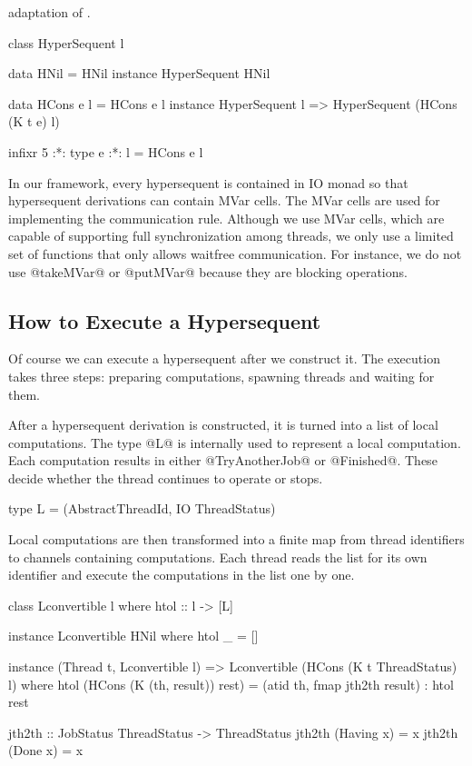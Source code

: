 adaptation of \citep{hetero}.
\begin{code}
class HyperSequent l

data HNil = HNil
instance HyperSequent HNil

data HCons e l = HCons e l
instance HyperSequent l =>
  HyperSequent (HCons (K t e) l)

infixr 5 :*:
type e :*: l = HCons e l
\end{code}
In our framework, every hypersequent is contained in IO monad
so that hypersequent derivations can contain MVar
cells. The MVar cells are used for implementing the communication
rule. Although we use MVar cells, which are capable of supporting full
synchronization among threads, we only use a limited set of functions
that only allows waitfree communication. For instance, we do not use
@takeMVar@ or @putMVar@ because they are blocking operations.

\subsection{How to Execute a Hypersequent}
Of course we can execute a hypersequent after we construct it.  The
execution takes three steps: preparing computations, spawning
threads and waiting for them.

After a hypersequent derivation is constructed, it is turned into a list
of local computations.  The type @L@ is internally used to represent a
local computation.  Each computation results in either @TryAnotherJob@
or @Finished@.  These decide whether the thread continues to operate or stops.
\begin{code}
type L = (AbstractThreadId, IO ThreadStatus)
\end{code}

Local computations are then transformed into a finite map from thread
identifiers to channels containing computations. Each thread reads the list for
its own identifier and execute the computations in the list one by one.
\begin{code}
class Lconvertible l where
    htol :: l -> [L]

instance Lconvertible HNil where
    htol _ = []

instance (Thread t, Lconvertible l) =>
 Lconvertible (HCons (K t ThreadStatus) l) where
    htol (HCons (K (th, result)) rest) =
      (atid th, fmap jth2th result) : htol rest

jth2th :: JobStatus ThreadStatus -> ThreadStatus
jth2th (Having x) = x
jth2th (Done x) = x
\end{code}

